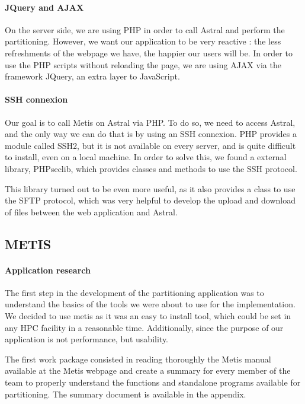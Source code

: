 \documentclass{cranfieldChart}
\begin{document}
\paragraph{JQuery and AJAX}
On the server side, we are using PHP in order to call Astral and perform the partitioning. However, we want our application to be very reactive : the less refreshments of the webpage we have, the happier our users will be. In order to use the PHP scripts without reloading the page, we are using AJAX via the framework JQuery, an extra layer to JavaScript.

\paragraph{SSH connexion}
Our goal is to call Metis on Astral via PHP. To do so, we need to access Astral, and the only way we can do that is by using an SSH connexion. PHP provides a module called SSH2, but it is not available on every server, and is quite difficult to install, even on a local machine. In order to solve this, we found a external library, PHPseclib, which provides classes and methods to use the SSH protocol.

This library turned out to be even more useful, as it also provides a class to use the SFTP protocol, which was very helpful to develop the upload and download of files between the web application and Astral.

\subsection{METIS}

\paragraph{Application research}
The first step in the development of the partitioning application was to understand the basics of the tools we were about to use for the implementation. We decided to use metis as it was an easy to install tool, which could be set in any HPC facility in a reasonable time. Additionally, since the purpose of our application is not performance, but usability.

The first work package consisted in reading thoroughly the Metis manual available at the Metis webpage and create a summary for every member of the team to properly understand the functions and standalone programs available for partitioning. The summary document is available in the appendix.
\end{document}
